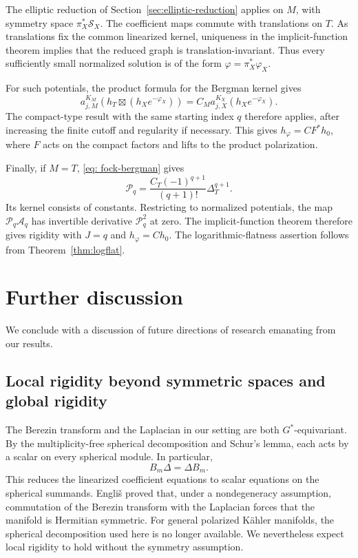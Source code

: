 \documentclass[11pt,reqno]{amsart}
\theoremstyle{corollary}
\theoremstyle{conjecture}
\theoremstyle{assumption}
\theoremstyle{proposition}
\theoremstyle{remark}
\numberwithin{equation}{section}
\begin{document}
The elliptic reduction of Section~\ref{sec:elliptic-reduction} applies on $M$, with symmetry space $\pi_X^*\mathcal S_X$. The coefficient maps commute with translations on $T$. As translations fix the common linearized kernel, uniqueness in the implicit-function theorem implies that the reduced graph is translation-invariant. Thus every sufficiently small normalized solution is of the form $\varphi=\pi_X^*\varphi_X$.

For such potentials, the product formula for the Bergman kernel gives
\[
a_{j,M}^{K_M}(h_T\boxtimes(h_Xe^{-\varphi_X}))=C_Ma_{j,X}^{K_X}(h_Xe^{-\varphi_X}).
\]
The compact-type result with the same starting index $q$ therefore applies, after increasing the finite cutoff and regularity if necessary. This gives $h_\varphi=CF^*h_0$, where $F$ acts on the compact factors and lifts to the product polarization.

Finally, if $M=T$, \eqref{eq: fock-bergman} gives
\[
 \mathcal P_q =\frac{C_T(-1)^{q+1}}{(q+1)!}\Delta_T^{q+1}.
\]
Its kernel consists of constants. Restricting to normalized potentials, the map $\mathcal P_q\mathcal A_q$ has invertible derivative $\mathcal P_q^2$ at zero. The implicit-function theorem therefore gives rigidity with $J=q$ and $h_\varphi=Ch_0$. The logarithmic-flatness assertion follows from Theorem~\ref{thm:logflat}.



\section{Further discussion}
\label{sec:further-discussion}

We conclude with a discussion of future directions of research emanating from our results.

\subsection{Local rigidity beyond symmetric spaces and global rigidity}
\label{subsec:global-local-rigidity}

The Berezin transform and the Laplacian in our setting are both $G^*$-equivariant. By the multiplicity-free spherical decomposition and Schur's lemma, each acts by a scalar on every spherical module. In particular,
\[
B_m\Delta=\Delta B_m.
\]
This reduces the linearized coefficient equations to scalar equations on the spherical summands. Engli\v{s} \cite{Englis2006Symmetric} proved that, under a nondegeneracy assumption, commutation of the Berezin transform with the Laplacian forces that the manifold is Hermitian symmetric. For general polarized K\"ahler manifolds, the spherical decomposition used here is no longer available. We nevertheless expect local rigidity to hold without the symmetry assumption.
\end{document}
